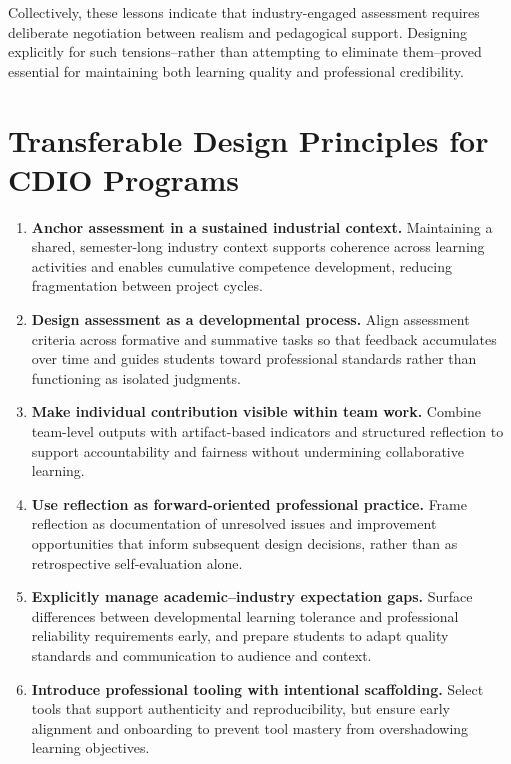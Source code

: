 Collectively, these lessons indicate that industry-engaged assessment requires deliberate negotiation between realism and pedagogical support. Designing explicitly for such tensions--rather than attempting to eliminate them--proved essential for maintaining both learning quality and professional credibility.

\section{Transferable Design Principles for CDIO Programs}

\begin{enumerate}
  \item \textbf{Anchor assessment in a sustained industrial context.}  
  Maintaining a shared, semester-long industry context supports coherence across learning activities and enables cumulative competence development, reducing fragmentation between project cycles.

  \item \textbf{Design assessment as a developmental process.}  
  Align assessment criteria across formative and summative tasks so that feedback accumulates over time and guides students toward professional standards rather than functioning as isolated judgments.

  \item \textbf{Make individual contribution visible within team work.}  
  Combine team-level outputs with artifact-based indicators and structured reflection to support accountability and fairness without undermining collaborative learning.

  \item \textbf{Use reflection as forward-oriented professional practice.}  
  Frame reflection as documentation of unresolved issues and improvement opportunities that inform subsequent design decisions, rather than as retrospective self-evaluation alone.

  \item \textbf{Explicitly manage academic–industry expectation gaps.}  
  Surface differences between developmental learning tolerance and professional reliability requirements early, and prepare students to adapt quality standards and communication to audience and context.

  \item \textbf{Introduce professional tooling with intentional scaffolding.}  
  Select tools that support authenticity and reproducibility, but ensure early alignment and onboarding to prevent tool mastery from overshadowing learning objectives.
\end{enumerate}

